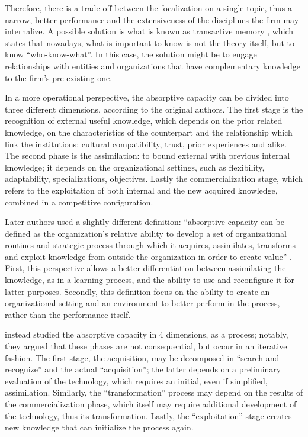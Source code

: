 Therefore, there is a trade-off between the focalization on a single topic, thus a narrow, better performance and the extensiveness of the disciplines the firm may internalize. A possible solution is what is known as transactive memory \citep{Wegner1987}, which states that nowadays, what is important to know is not the theory itself, but to know \enquote{who-know-what}. In this case, the solution might be to engage relationships with entities and organizations that have complementary knowledge to the firm's pre-existing one. 

In a more operational perspective, the absorptive capacity can be divided into three different dimensions, according to the original authors. The first stage is the recognition of external useful knowledge, which depends on the prior related knowledge, on the characteristics of the counterpart and the relationship which link the institutions: cultural compatibility, trust, prior experiences and alike. The second phase is the assimilation: to bound external with previous internal knowledge; it depends on the organizational settings, such as flexibility, adaptability, specializations, objectives. Lastly the commercialization stage, which refers to the exploitation of both internal and the new acquired knowledge, combined in a competitive configuration.

Later authors used a slightly different definition: \enquote{absorptive capacity can be defined as the organization's relative ability to develop a set of organizational routines and strategic process through which it acquires, assimilates, transforms and exploit knowledge from outside the organization in order to create value} \citep{Jimenez2011}. First, this perspective allows a better differentiation between assimilating the knowledge, as in a learning process, and the ability to use and reconfigure it for latter purposes. Secondly, this definition focus on the ability to create an organizational setting and an environment to better perform in the process, rather than the performance itself. 

\citet{Patterson2015} instead studied the absorptive capacity in 4 dimensions, as a process; notably, they argued that these phases are not consequential, but occur in an iterative fashion. The first stage, the acquisition, may be decomposed in \enquote{search and recognize} and the actual \enquote{acquisition}; the latter depends on a preliminary evaluation of the technology, which requires an initial, even if simplified, assimilation. Similarly, the \enquote{transformation} process may depend on the results of the commercialization phase, which itself may require additional development of the technology, thus its transformation. Lastly, the \enquote{exploitation} stage creates new knowledge that can initialize the process again. 

